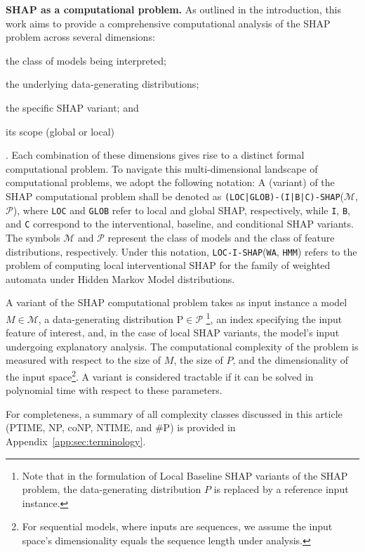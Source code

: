
\textbf{SHAP as a computational problem.} As outlined in the introduction, this work aims to provide a comprehensive computational analysis of the SHAP problem across several dimensions: \begin{inparaenum}[(i)] \item the class of models being interpreted; \item the underlying data-generating distributions; \item the specific SHAP variant; and \item its scope (global or local)\end{inparaenum}. Each combination of these dimensions gives rise to a distinct formal computational problem. To navigate this multi-dimensional landscape of computational problems, we adopt the following notation:
A (variant) of the SHAP computational problem shall be denoted as \texttt{(LOC|GLOB)-(I|B|C)-SHAP}($\mathcal{M}$,$\mathcal{P}$), where \texttt{LOC} and \texttt{GLOB} refer to local and global SHAP, respectively, while \texttt{I}, \texttt{B}, and \texttt{C} correspond to the interventional, baseline, and conditional SHAP variants. The symbols $\mathcal{M}$ and $\mathcal{P}$ represent the class of models and the class of feature distributions, respectively. Under this notation, \texttt{LOC-I-SHAP}(\texttt{WA}, \texttt{HMM}) refers to the problem of computing local interventional SHAP for the family of weighted automata under Hidden Markov Model distributions.


 A variant of the SHAP computational problem takes as input instance a model $M \in \mathcal{M}$, a data-generating distribution 
$\text{P} \in \mathcal{P}$ \footnote{Note that in the formulation of Local Baseline SHAP variants of the SHAP problem, the data-generating distribution $P$ is replaced by a reference input instance.}, an index specifying the input feature of interest, and, in the case of local SHAP variants, the  model's input undergoing explanatory analysis. The computational complexity of the problem is measured with respect to the size of $M$, the size of $P$, and the dimensionality of the input space\footnote{For sequential models, where inputs are sequences, we assume the input space's dimensionality equals the sequence length under analysis.}. A variant is considered tractable if it can be solved in polynomial time with respect to these parameters.

For completeness, a summary of all complexity classes discussed in this article (PTIME, NP, coNP, NTIME, and \#P) is provided in Appendix~\ref{app:sec:terminology}.


